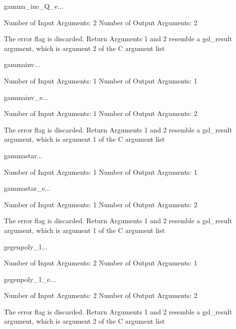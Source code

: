 \begin{funcdesc}{gamma_inc_Q_e}{...}

    Number of Input  Arguments:  2
    Number of Output Arguments:  2

The error flag is discarded.
Return Arguments 1 and 2 resemble a gsl_result argument,
	which is  argument 2 of the C argument list

\end{funcdesc}

\begin{funcdesc}{gammainv}{...}

    Number of Input  Arguments:  1
    Number of Output Arguments:  1
\end{funcdesc}

\begin{funcdesc}{gammainv_e}{...}

    Number of Input  Arguments:  1
    Number of Output Arguments:  2

The error flag is discarded.
Return Arguments 1 and 2 resemble a gsl_result argument,
	which is  argument 1 of the C argument list

\end{funcdesc}

\begin{funcdesc}{gammastar}{...}

    Number of Input  Arguments:  1
    Number of Output Arguments:  1
\end{funcdesc}

\begin{funcdesc}{gammastar_e}{...}

    Number of Input  Arguments:  1
    Number of Output Arguments:  2

The error flag is discarded.
Return Arguments 1 and 2 resemble a gsl_result argument,
	which is  argument 1 of the C argument list

\end{funcdesc}

\begin{funcdesc}{gegenpoly_1}{...}

    Number of Input  Arguments:  2
    Number of Output Arguments:  1
\end{funcdesc}

\begin{funcdesc}{gegenpoly_1_e}{...}

    Number of Input  Arguments:  2
    Number of Output Arguments:  2

The error flag is discarded.
Return Arguments 1 and 2 resemble a gsl_result argument,
	which is  argument 2 of the C argument list

\end{funcdesc}

